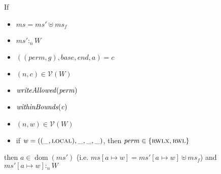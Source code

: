 \documentclass[a4paper]{article}
\newcommand{\update}[2]{[#1 \mapsto #2]}
\DeclareMathOperator{\dom}{dom}
\newcommand{\var}[1]{\mathit{#1}}
\newcommand{\hs}{\var{ms}}
\newcommand{\ms}{\hs}
\newcommand{\gl}{\var{g}}
\newcommand{\addr}{\var{a}}
\newcommand{\start}{\var{base}}
\newcommand{\addrend}{\var{end}}
\newcommand{\heap}{\var{mem}}
\newcommand{\perm}{\var{perm}}
\newcommand{\plainfun}[2]{
  \ifthenelse{\equal{#2}{}}
  {\mathit{#1}}
  {\mathit{#1}(#2)}
}
\newcommand{\writeAllowed}[1]{\plainfun{writeAllowed}{#1}}
\newcommand{\withinBounds}[1]{\plainfun{withinBounds}{#1}}
\newcommand{\heapSat}[3][\heap]{#1 :_{#2} #3}
\newcommand{\asmType}{\plaindom{AsmType}}
\newcommand{\plaindom}[1]{\mathrm{#1}}
\newcommand{\intr}[2]{\mathcal{#1}}
\newcommand{\valueintr}[1]{\intr{V}{#1}}
\newcommand{\stdvr}{\valueintr{\asmType}}
\newcommand{\npair}[2][n]{\left(#1,#2 \right)}
\newcommand{\plainperm}[1]{\textsc{#1}}
\newcommand{\readwritel}{\plainperm{rwl}}
\newcommand{\rwlx}{\plainperm{rwlx}}
\newcommand{\local}{\plainperm{local}}
\begin{document}
 
 \begin{lemma}
   \label{lem:conds-store-suff}
   If 
   \begin{itemize}
   \item $\ms = \ms' \uplus \ms_f$
   \item $\heapSat[\ms']{n}{W}$
   \item $((\perm,\gl),\start,\addrend,\addr) = c$
   \item $\npair{c}\in\stdvr(W)$
   \item $\writeAllowed{\perm}$
   \item $\withinBounds{\var{c}}$
   \item $\npair{\var{w}}\in\stdvr(W)$
   \item if $\var{w} = ((\_,\local),\_,\_,\_)$, then $\perm \in
     \{\rwlx,\readwritel \}$
   \end{itemize}
 
   then $\addr \in \dom(\ms')$ (i.e. $\ms\update{a}{w} =
   \ms'\update{a}{w}\uplus\ms_f$) and
   $\heapSat[{\ms'\update{\addr}{\var{w}}}]{n}{W}$
 \end{lemma}
\end{document}
